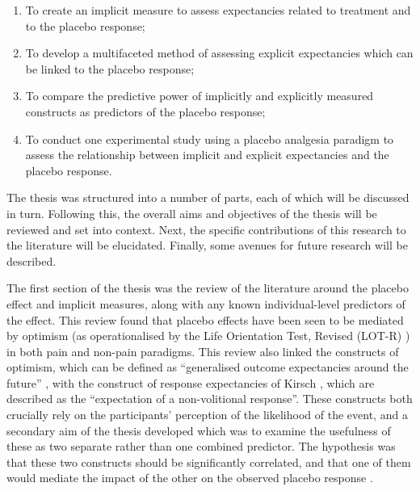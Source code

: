 \begin{enumerate}


\item To create an implicit measure to assess expectancies related to treatment and to the placebo response;

\item To develop a multifaceted method of assessing explicit expectancies which can be linked to the placebo response;

\item To compare the predictive power of implicitly and explicitly measured constructs as predictors of the placebo response;

\item To conduct one  experimental study using a placebo analgesia paradigm to assess the relationship between implicit and explicit expectancies and the placebo response.
\end{enumerate}




The thesis was structured into a number of parts, each of which will
be discussed in turn. Following this, the overall aims and
objectives of the thesis will be reviewed and set into context. 
Next, the specific contributions of this research to the literature will be elucidated. 
Finally, some avenues for future research will be described.

The first section of the thesis was the review of the literature
around the placebo effect and implicit measures, along with any known
individual-level predictors of the effect. This review found that
placebo effects have been seen to be mediated by optimism (as
operationalised by the Life Orientation Test, Revised (LOT-R)
\cite{Scheier1994}) \cite{Geers2005,morton2009reproducibility} in both
pain and non-pain paradigms. This review also linked the constructs of
optimism, which can be defined as ``generalised outcome expectancies
around the future'' \cite{Carver2010}, with the construct of response
expectancies of Kirsch \cite{Kirsch1985,Kirsch1997}, which are
described as the ``expectation of a non-volitional response''. These
constructs both crucially rely on the participants' perception of the
likelihood of the event, and a secondary aim of the thesis developed
which was to examine the usefulness of these as two separate rather
than one combined predictor. The hypothesis was that these two
constructs should be significantly correlated, and that one of them
would mediate the impact of the other on the observed placebo response
\cite{Geers2005}.

